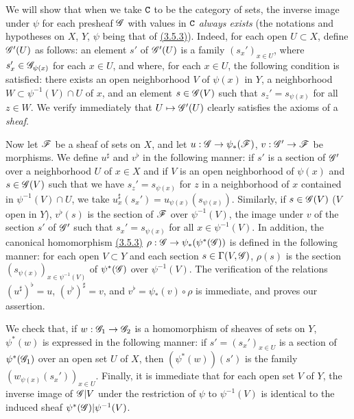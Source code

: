 \begin{env}[3.7.1]
\label{0.3.7.1}
We will show that when we take $\mathtt{C}$ to be the category of sets, the inverse
image under $\psi$ for each presheaf $\mathscr{G}$ with values in $\mathtt{C}$ {\em always
exists} (the notations and hypotheses on $X$, $Y$, $\psi$ being that of
\hyperref[0.3.5.3]{(3.5.3)}). Indeed, for each open $U\subset X$, define $\mathscr{G}'(U)$
as follows: an element $s'$ of $\mathscr{G}'(U)$ is a family $(s_x')_{x\in U}$, where
$s_x'\in\mathscr{G}_{\psi(x)}$ for each $x\in U$, and where, for each $x\in U$, the
following condition is satisfied: there exists an open neighborhood $V$ of
$\psi(x)$ in $Y$, a neighborhood $W\subset\psi^{-1}(V)\cap U$ of $x$, and an
element $s\in\mathscr{G}(V)$ such that $s_z'=s_{\psi(x)}$ for all $z\in W$. We verify
immediately that $U\mapsto\mathscr{G}'(U)$ clearly satisfies the axioms of a
{\em sheaf}.

Now let $\mathscr{F}$ be a sheaf of sets on $X$, and let $u:\mathscr{G}\to\psi_*(\mathscr{F})$,
$v:\mathscr{G}'\to\mathscr{F}$ be morphisms. We define $u^\sharp$ and $v^\flat$ in the
following manner: if $s'$ is a section of $\mathscr{G}'$ over a neighborhood $U$ of
$x\in X$ and if $V$ is an open neighborhood of $\psi(x)$ and $s\in\mathscr{G}(V)$
such that we have $s_z'=s_{\psi(x)}$ for $z$ in a neighborhood of $x$ contained
in $\psi^{-1}(V)\cap U$, we take $u_x^\sharp(s_x')=u_{\psi(x)}(s_{\psi(x)})$.
Similarly, if $s\in\mathscr{G}(V)$ ($V$ open in $Y$), $v^\flat(s)$ is the section of
$\mathscr{F}$ over $\psi^{-1}(V)$, the image under $v$ of the section $s'$ of
$\mathscr{G}'$ such that $s_x'=s_{\psi(x)}$ for all $x\in\psi^{-1}(V)$. In addition,
the canonical homomorphism \hyperref[0.3.5.3]{(3.5.3)}
$\rho:\mathscr{G}\to\psi_*(\psi^*(\mathscr{G}))$ is defined in the following manner: for
each open $V\subset Y$ and each section $s\in\Gamma(V,\mathscr{G})$, $\rho(s)$ is the
section $(s_{\psi(x)})_{x\in\psi^{-1}(V)}$ of $\psi^*(\mathscr{G})$ over
$\psi^{-1}(V)$. The verification of the relations $(u^\sharp)^\flat=u$,
$(v^\flat)^\sharp=v$, and $v^\flat=\psi_*(v)\circ\rho$ is immediate, and proves
our assertion.

We check that, if $w:\mathscr{G}_1\to\mathscr{G}_2$ is a homomorphism of sheaves of sets
on $Y$, $\psi^*(w)$ is expressed in the following manner: if
$s'=(s_x')_{x\in U}$ is a section of $\psi^*(\mathscr{G}_1)$ over an open set $U$ of
$X$, then $(\psi^*(w))(s')$ is the family $(w_{\psi(x)}(s_x'))_{x\in U}$.
Finally, it is immediate that for each open set $V$ of $Y$, the inverse image of
$\mathscr{G}|V$ under the restriction of $\psi$ to $\psi^{-1}(V)$ is identical to the
induced sheaf $\psi^*(\mathscr{G})|\psi^{-1}(V)$.


\end{env}

